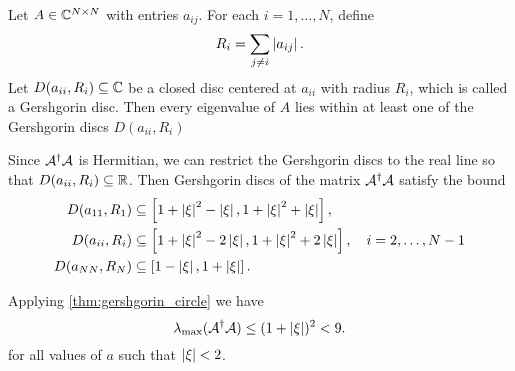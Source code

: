 \begin{thm}
Let $A\in\mathbb{C}^{N\times N}$ with entries $a_{ij}$.
For each $i=1,\ldots,N$, define
\begin{equation}
R_i=\sum_{j\ne i}\left\lvert a_{ij}\right\rvert.
\end{equation}
Let $D(a_{ii},R_i)\subseteq \mathbb{C}$ be a closed disc centered at $a_{ii}$ with radius $R_i$, which is called a Gershgorin disc.
Then every eigenvalue of $A$ lies within at least one of the Gershgorin discs $D(a_{ii},R_i)$
\label{thm:gershgorin_circle}
\end{thm}

Since $\mathcal{A}^{\dag}\mathcal{A}$ is Hermitian, we can restrict the Gershgorin discs to the real line so that $D(a_{ii},R_i)\subseteq \mathbb{R}$. 
Then Gershgorin discs of the matrix $\mathcal{A}^{\dag}\mathcal{A}$ satisfy the bound
\begin{equation}
\begin{split}
D(a_{11},R_1)&\subseteq \left[1+\left\lvert\xi\right\rvert^2-\left\lvert\xi\right\rvert,1+\left\lvert\xi\right\rvert^2+\left\lvert\xi\right\rvert\right],\\
D(a_{ii},R_i)&\subseteq \left[1+\left\lvert\xi\right\rvert^2-2\left\lvert\xi\right\rvert,1+\left\lvert\xi\right\rvert^2+2\left\lvert\xi\right\rvert\right], \quad i=2,\ldots, N-1\\
D(a_{NN},R_N)&\subseteq \left[1-\left\lvert\xi\right\rvert,1+\left\lvert\xi\right\rvert\right].
\end{split}
\end{equation}

Applying \cref{thm:gershgorin_circle}  we have
\begin{equation}
\lambda_{\max}(\mathcal{A}^{\dag}\mathcal{A}) \le (1+\left\lvert\xi\right\rvert)^2< 9.
\end{equation}
for all values of $a$ such that $\left\lvert\xi\right\rvert<2$.

